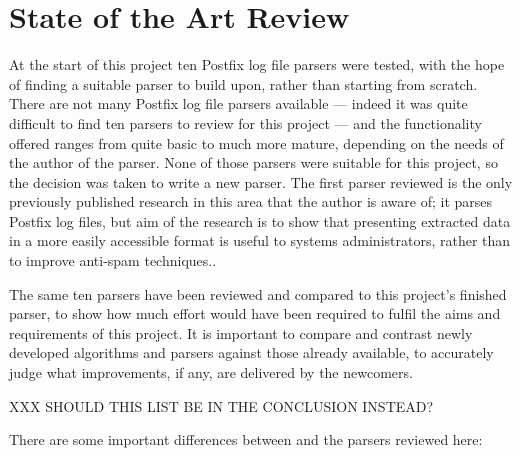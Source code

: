\chapter{State of the Art Review}

\label{state of the art review}

At the start of this project ten Postfix log file parsers were tested, with
the hope of finding a suitable parser to build upon, rather than starting
from scratch.  There are not many Postfix log file parsers available ---
indeed it was quite difficult to find ten parsers to review for this
project --- and the functionality offered ranges from quite basic to much
more mature, depending on the needs of the author of the parser.  None of
those parsers were suitable for this project, so the decision was taken to
write a new parser.  The first parser reviewed is the only previously
published research in this area that the author is aware of; it parses
Postfix log files, but aim of the research is to show that presenting
extracted data in a more easily accessible format is useful to systems
administrators, rather than to improve anti-spam techniques..

The same ten parsers have been reviewed and compared to this project's
finished parser, to show how much effort would have been required to fulfil
the aims and requirements of this project.  It is important to compare and
contrast newly developed algorithms and parsers against those already
available, to accurately judge what improvements, if any, are delivered by
the newcomers.

XXX SHOULD THIS LIST BE IN THE CONCLUSION INSTEAD\@?

There are some important differences between \parsername{} and the parsers
reviewed here:

